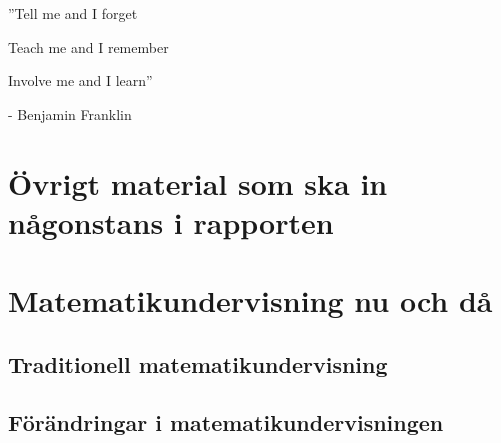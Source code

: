 \documentclass[11pt,a4paper]{article}
\begin{document}



\newpage

\begin{centering}
\Huge
''Tell me and I forget 

Teach me and I remember

Involve me and I learn''

\end{centering}
\bigskip
\begin{centering}

\Large
- Benjamin Franklin

\end{centering}
\newpage

\renewcommand\abstractname{Sammandrag}\begin{abstract}

\end{abstract}

\newpage

\renewcommand\abstractname{Abstract}
\begin{abstract} 

\end{abstract}

\newpage
 
\tableofcontents

\newpage
{}

\section*{Övrigt material som ska in någonstans i rapporten}
    

\section{Matematikundervisning nu och då}
    
    
    \subsection{Traditionell matematikundervisning}
        \label{sec:Traditionellt}
        
    
    \subsection{Förändringar i matematikundervisningen}
        \label{sec:Forandringar}
        
        
\end{document}
